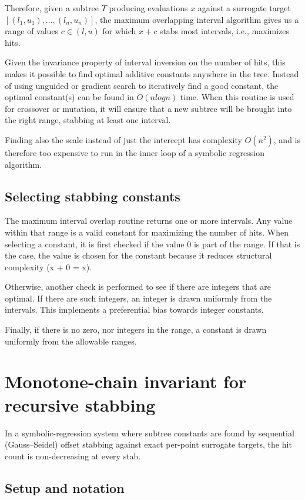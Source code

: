 \documentclass{llncs}
\begin{document}
Therefore, given a subtree $T$ producing evaluations $x$ against a surrogate target $[(l_1, u_1), ..., (l_n, u_n)]$, the maximum overlapping interval algorithm gives us a range of values $c \in (l,u)$ for which $x + c$ stabs most intervals, i.e., maximizes hits. 

Given the invariance property of interval inversion on the number of hits, this makes it possible to find optimal additive constants anywhere in the tree. Instead of using unguided or gradient search to iteratively find a good constant, the optimal constant(s) can be found in $O(n log n)$ time. When this routine is used for crossover or mutation, it will ensure that a new subtree will be brought into the right range, stabbing at least one interval. 


Finding also the scale instead of just the intercept has complexity $O(n^2)$, and is therefore too expensive to run in the inner loop of a symbolic regression algorithm.

\subsection{Selecting stabbing constants}
\label{sec:selecting}

The maximum interval overlap routine returns one or more intervals. Any value within that range is a valid constant for maximizing the number of hits. When selecting a constant, it is first checked if the value 0 is part of the range. If that is the case, the value is chosen for the constant because it reduces structural complexity (x + 0 = x).

Otherwise, another check is performed to see if there are integers that are optimal. If there are such integers, an integer is drawn uniformly from the intervals. This implements a preferential bias towards integer constants. 

Finally, if there is no zero, nor integers in the range, a constant is drawn uniformly from the allowable ranges. 

\section{Monotone-chain invariant for recursive stabbing}

In a symbolic-regression system where subtree constants are found by sequential
(Gauss--Seidel) offset stabbing against exact per-point surrogate targets, the hit
count is non-decreasing at every stab.

\subsection{Setup and notation}
\end{document}

